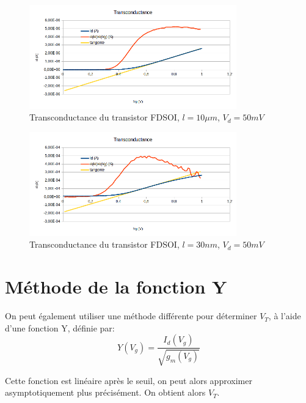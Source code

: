 \documentclass[a4paper,11pt]{report}
\begin{document}
\begin{figure}[h]
    \begin{center}
        \includegraphics[width=0.8\textwidth]{Images/FD1-10-Transconductance}
        \caption{Transconductance du transistor FDSOI, $l=10\mu m$, $V_d = 50mV$}
        \label{transc_fdsoi_10um}
    \end{center}
\end{figure}
\begin{figure}[h]
    \begin{center}
        \includegraphics[width=0.8\textwidth]{Images/FD11-30-Transconductance}
        \caption{Transconductance du transistor FDSOI, $l=30nm$, $V_d = 50mV$}
        \label{transc_fdsoi_30nm}
    \end{center}
\end{figure}



\section{Méthode de la fonction Y}
On peut également utiliser une méthode différente pour déterminer $V_T$, à l'aide d'une fonction Y, définie par:
\[Y(V_g)=\dfrac{I_d(V_g)}{\sqrt{g_m(V_g)}}\]

Cette fonction est linéaire après le seuil, on peut alors approximer asymptotiquement plus précisément. On obtient alors $V_T$.
\end{document}
